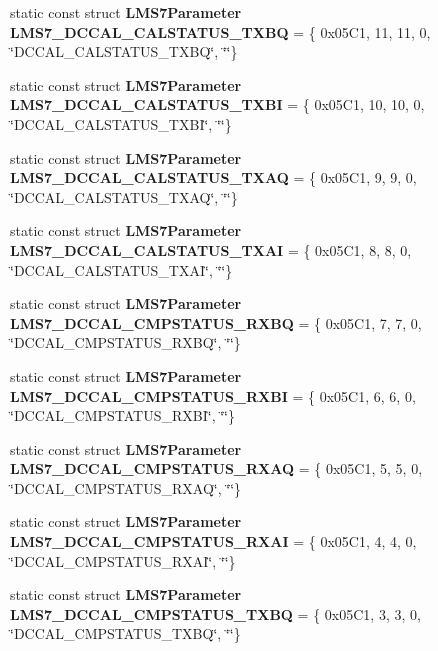 \begin{DoxyCompactItemize}
\item 
static const struct {\bf L\+M\+S7\+Parameter} {\bf L\+M\+S7\+\_\+\+D\+C\+C\+A\+L\+\_\+\+C\+A\+L\+S\+T\+A\+T\+U\+S\+\_\+\+T\+X\+BQ} = \{ 0x05\+C1, 11, 11, 0, \char`\"{}\+D\+C\+C\+A\+L\+\_\+\+C\+A\+L\+S\+T\+A\+T\+U\+S\+\_\+\+T\+X\+B\+Q\char`\"{}, \char`\"{}\char`\"{}\}
\item 
static const struct {\bf L\+M\+S7\+Parameter} {\bf L\+M\+S7\+\_\+\+D\+C\+C\+A\+L\+\_\+\+C\+A\+L\+S\+T\+A\+T\+U\+S\+\_\+\+T\+X\+BI} = \{ 0x05\+C1, 10, 10, 0, \char`\"{}\+D\+C\+C\+A\+L\+\_\+\+C\+A\+L\+S\+T\+A\+T\+U\+S\+\_\+\+T\+X\+B\+I\char`\"{}, \char`\"{}\char`\"{}\}
\item 
static const struct {\bf L\+M\+S7\+Parameter} {\bf L\+M\+S7\+\_\+\+D\+C\+C\+A\+L\+\_\+\+C\+A\+L\+S\+T\+A\+T\+U\+S\+\_\+\+T\+X\+AQ} = \{ 0x05\+C1, 9, 9, 0, \char`\"{}\+D\+C\+C\+A\+L\+\_\+\+C\+A\+L\+S\+T\+A\+T\+U\+S\+\_\+\+T\+X\+A\+Q\char`\"{}, \char`\"{}\char`\"{}\}
\item 
static const struct {\bf L\+M\+S7\+Parameter} {\bf L\+M\+S7\+\_\+\+D\+C\+C\+A\+L\+\_\+\+C\+A\+L\+S\+T\+A\+T\+U\+S\+\_\+\+T\+X\+AI} = \{ 0x05\+C1, 8, 8, 0, \char`\"{}\+D\+C\+C\+A\+L\+\_\+\+C\+A\+L\+S\+T\+A\+T\+U\+S\+\_\+\+T\+X\+A\+I\char`\"{}, \char`\"{}\char`\"{}\}
\item 
static const struct {\bf L\+M\+S7\+Parameter} {\bf L\+M\+S7\+\_\+\+D\+C\+C\+A\+L\+\_\+\+C\+M\+P\+S\+T\+A\+T\+U\+S\+\_\+\+R\+X\+BQ} = \{ 0x05\+C1, 7, 7, 0, \char`\"{}\+D\+C\+C\+A\+L\+\_\+\+C\+M\+P\+S\+T\+A\+T\+U\+S\+\_\+\+R\+X\+B\+Q\char`\"{}, \char`\"{}\char`\"{}\}
\item 
static const struct {\bf L\+M\+S7\+Parameter} {\bf L\+M\+S7\+\_\+\+D\+C\+C\+A\+L\+\_\+\+C\+M\+P\+S\+T\+A\+T\+U\+S\+\_\+\+R\+X\+BI} = \{ 0x05\+C1, 6, 6, 0, \char`\"{}\+D\+C\+C\+A\+L\+\_\+\+C\+M\+P\+S\+T\+A\+T\+U\+S\+\_\+\+R\+X\+B\+I\char`\"{}, \char`\"{}\char`\"{}\}
\item 
static const struct {\bf L\+M\+S7\+Parameter} {\bf L\+M\+S7\+\_\+\+D\+C\+C\+A\+L\+\_\+\+C\+M\+P\+S\+T\+A\+T\+U\+S\+\_\+\+R\+X\+AQ} = \{ 0x05\+C1, 5, 5, 0, \char`\"{}\+D\+C\+C\+A\+L\+\_\+\+C\+M\+P\+S\+T\+A\+T\+U\+S\+\_\+\+R\+X\+A\+Q\char`\"{}, \char`\"{}\char`\"{}\}
\item 
static const struct {\bf L\+M\+S7\+Parameter} {\bf L\+M\+S7\+\_\+\+D\+C\+C\+A\+L\+\_\+\+C\+M\+P\+S\+T\+A\+T\+U\+S\+\_\+\+R\+X\+AI} = \{ 0x05\+C1, 4, 4, 0, \char`\"{}\+D\+C\+C\+A\+L\+\_\+\+C\+M\+P\+S\+T\+A\+T\+U\+S\+\_\+\+R\+X\+A\+I\char`\"{}, \char`\"{}\char`\"{}\}
\item 
static const struct {\bf L\+M\+S7\+Parameter} {\bf L\+M\+S7\+\_\+\+D\+C\+C\+A\+L\+\_\+\+C\+M\+P\+S\+T\+A\+T\+U\+S\+\_\+\+T\+X\+BQ} = \{ 0x05\+C1, 3, 3, 0, \char`\"{}\+D\+C\+C\+A\+L\+\_\+\+C\+M\+P\+S\+T\+A\+T\+U\+S\+\_\+\+T\+X\+B\+Q\char`\"{}, \char`\"{}\char`\"{}\}

\end{DoxyCompactItemize}
